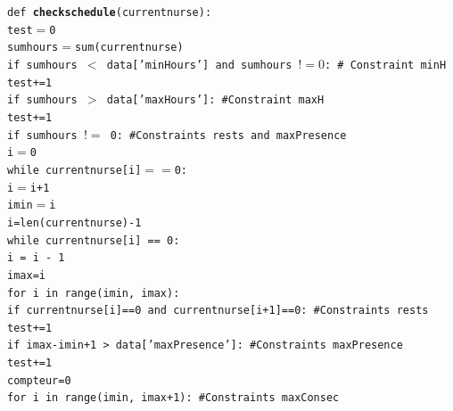 \documentclass[11pt]{article}
\begin{document}
\begin{appendix}
\noindent
{\tt def {\bf checkschedule}(currentnurse):\\
    test$=$0\\
    sumhours$=$sum(currentnurse)\\
    if sumhours $<$ data['minHours'] and sumhours $!=0$: \# Constraint minH\\
  \hspace*{1cm}       test+=1\\
    if sumhours $>$ data['maxHours']:   \#Constraint maxH\\
 \hspace*{1cm}        test+=1\\
    if sumhours $!=$ 0:        \#Constraints rests and maxPresence\\
 \hspace*{1cm}        i$=$0\\
 \hspace*{1cm}        while currentnurse[i]$==$0:\\
 \hspace*{1.5cm}            i$=$i+1\\
\hspace*{1cm}         imin$=$i\\
 \hspace*{1cm}        i=len(currentnurse)-1\\
 \hspace*{1cm}        while currentnurse[i] == 0:\\
\hspace*{1.5cm}             i = i - 1\\
\hspace*{1cm}         imax=i \\
\hspace*{1cm}         for i in range(imin, imax):\\
 \hspace*{1.5cm}            if currentnurse[i]==0 and currentnurse[i+1]==0:   \#Constraints rests\\
 \hspace*{2cm}                test+=1\\
\hspace*{1cm}         if imax-imin+1 > data['maxPresence']:       \#Constraints maxPresence\\
\hspace*{1.5cm}             test+=1\\
\hspace*{1cm}         compteur=0\\
 \hspace*{1cm}        for i in range(imin, imax+1):               \#Constraints maxConsec\\
}
\end{appendix}
\end{document}
